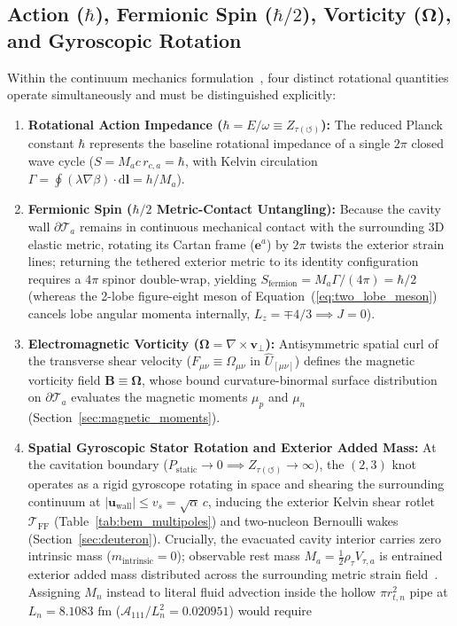 \documentclass[11pt, a4paper]{article}
\DeclareRobustCommand{\dd}{\mathrm{d}}
\begin{document}
\subsection{\texorpdfstring{Action ($\hbar$), Fermionic Spin ($\hbar/2$), Vorticity ($\boldsymbol{\Omega}$), and Gyroscopic Rotation}{Action, Fermionic Spin, Vorticity, and Gyroscopic Rotation}}
Within the continuum mechanics formulation~\cite{bairmosheh2026,bairmosheh2026b}, four distinct rotational quantities operate simultaneously and must be distinguished explicitly:
\begin{enumerate}[leftmargin=1.8em, itemsep=2pt]
    \item \textbf{Rotational Action Impedance ($\hbar = E/\omega \equiv Z_{\tau(\circlearrowleft)}$):} The reduced Planck constant $\hbar$ represents the baseline rotational impedance of a single $2\pi$ closed wave cycle ($S = M_a c\,r_{c,a} = \hbar$, with Kelvin circulation $\Gamma = \oint (\lambda\nabla\beta)\cdot\dd\mathbf{l} = h/M_a$).
    \item \textbf{Fermionic Spin ($\hbar/2$ Metric-Contact Untangling):} Because the cavity wall $\partial\mathcal{T}_a$ remains in continuous mechanical contact with the surrounding 3D elastic metric, rotating its Cartan frame ($\mathbf{e}^a$) by $2\pi$ twists the exterior strain lines; returning the tethered exterior metric to its identity configuration requires a $4\pi$ spinor double-wrap, yielding $S_{\mathrm{fermion}} = M_a\Gamma/(4\pi) = \hbar/2$ (whereas the 2-lobe figure-eight meson of Equation~(\ref{eq:two_lobe_meson}) cancels lobe angular momenta internally, $L_z = \mp 4/3 \implies J = 0$).
    \item \textbf{Electromagnetic Vorticity ($\boldsymbol{\Omega} = \nabla \times \mathbf{v}_\perp$):} Antisymmetric spatial curl of the transverse shear velocity ($F_{\mu\nu} \equiv \Omega_{\mu\nu}$ in $\hat{U}_{[\mu\nu]}$) defines the magnetic vorticity field $\mathbf{B} \equiv \boldsymbol{\Omega}$, whose bound curvature-binormal surface distribution on $\partial\mathcal{T}_a$ evaluates the magnetic moments $\mu_p$ and $\mu_n$ (Section~\ref{sec:magnetic_moments}).
    \item \textbf{Spatial Gyroscopic Stator Rotation and Exterior Added Mass:} At the cavitation boundary ($P_{\mathrm{static}} \to 0 \implies Z_{\tau(\circlearrowleft)} \to \infty$), the $(2,3)$ knot operates as a rigid gyroscope rotating in space and shearing the surrounding continuum at $|\mathbf{u}_{\mathrm{wall}}| \le v_s = \sqrt{\alpha}\,c$, inducing the exterior Kelvin shear rotlet $\mathcal{T}_{\mathrm{FF}}$ (Table~\ref{tab:bem_multipoles}) and two-nucleon Bernoulli wakes (Section~\ref{sec:deuteron}). Crucially, the evacuated cavity interior carries zero intrinsic mass ($m_{\mathrm{intrinsic}} = 0$); observable rest mass $M_a = \frac{1}{2}\rho_\tau V_{\tau,a}$ is entrained exterior added mass distributed across the surrounding metric strain field~\cite{bairmosheh2026}. Assigning $M_n$ instead to literal fluid advection inside the hollow $\pi r_{t,n}^2$ pipe at $L_n = 8.1083\text{ fm}$ ($\mathcal{A}_{111}/L_n^2 = 0.020951$) would require

\end{enumerate}
\end{document}

